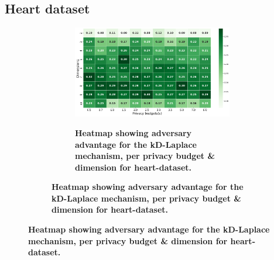 \subsection{Heart dataset}
\begin{figure}[H]
  \centering
  \begin{subfigure}[b]{0.85\textwidth}
    \begin{subfigure}[c]{1\textwidth}
      \caption{\textbf{Heatmap showing adversary advantage for the kD-Laplace mechanism, per privacy budget \& dimension for heart-dataset.}}
      \includegraphics[width=1\textwidth]{Results/kd-laplace/kd-Laplace/heart-dataset/shokri_mi_adv.png}
      \label{fig:privacy_heart-dataset_adversial_advantage_kd-laplace}
    \end{subfigure}
    \vfill %


\end{subfigure}
\end{figure}
